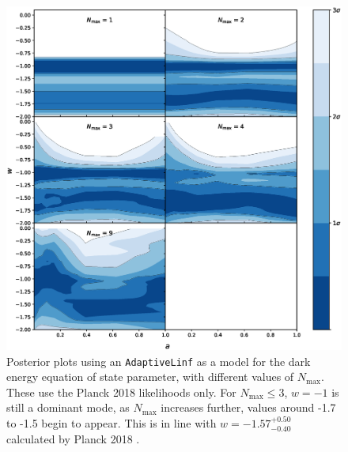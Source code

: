 \documentclass{article}
\begin{document}
\newpage

\begin{figure}[H]
  \centering
  \includegraphics[width=16cm]{adaptivew.eps}
  \caption{Posterior plots using an \texttt{AdaptiveLinf} as a model for the dark energy equation of state parameter, with different values of $N_\textrm{max}$. These use the Planck 2018 likelihoods only. For $N_\textrm{max}\le 3$, $w=-1$ is still a dominant mode, as $N_\textrm{max}$ increases further, values around -1.7 to -1.5 begin to appear. This is in line with $w=-1.57_{-0.40}^{+0.50}$ calculated by Planck 2018 \cite{planck_6}.}
  \label{fig:externalwa}
\end{figure}

\newpage
\end{document}
